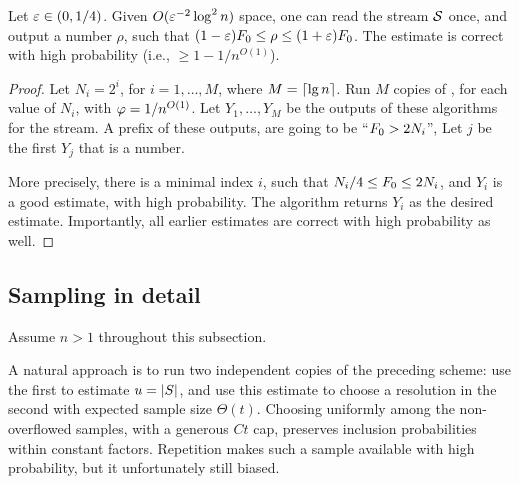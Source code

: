 \begin{lemma}
    Let ${\varepsilon} \in (0,1/4)$.  Given $O({\varepsilon}^{-2} \log^2 n)$ space, one
    can read the stream $\mathcal{S}$ once, and output a number $\rho$, such
    that $(1-{\varepsilon})F_0 \leq \rho \leq (1+{\varepsilon})F_0$. The estimate
    is correct with high probability (i.e., $\geq 1-1/n^{O(1)}$).
\end{lemma}
\begin{proof}
    Let $N_i = 2^i$, for $i=1, \ldots, M$, where $M = \left\lceil {\lg n} \right\rceil$. Run
    $M$ copies of , for each value of $N_i$,
    with $\varphi = 1/n^{O(1)}$. Let $Y_1, \ldots, Y_M$ be the outputs of
    these algorithms for the stream. A prefix of these outputs, are going
    to be ``$F_0 > 2N_i$'', Let $j$ be the first $Y_j$ that is a
    number.

  

    More precisely, there is a minimal index $i$, such that
    $N_i/4 \leq F_0 \leq 2N_i$, and $Y_i$ is a good estimate, with high
    probability. The algorithm returns $Y_i$ as the desired estimate.
    Importantly, all earlier estimates are correct with high probability
    as well.
\end{proof}


\subsection{Sampling in detail}

Assume $n>1$ throughout this subsection.

\begin{remark}
    A natural approach is to run two independent copies of the preceding
    scheme: use the first to estimate $u=\left| {S} \right|$, and use this estimate
    to choose a resolution in the second with expected sample size
    $\Theta(t)$. Choosing uniformly among the non-overflowed samples, with
    a generous $Ct$ cap, preserves inclusion probabilities within constant
    factors. Repetition makes such a sample available with high
    probability, but it unfortunately still biased.
\end{remark}

